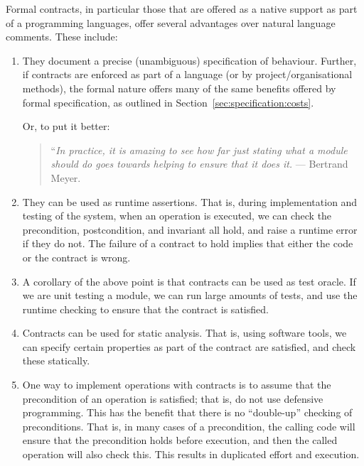 Formal contracts, in particular those that are offered as a native support as part of a programming languages, offer several advantages over natural language comments. These include:

\begin{enumerate}

 \item They document a precise (unambiguous) specification of behaviour. Further, if contracts are enforced as part of a language (or by project/organisational methods), the formal nature offers many of the same benefits offered by formal specification, as outlined in Section~\ref{sec:specification:costs}.

 Or, to put it better:

\begin{quote}
``\emph{In practice, it is amazing to see how far just stating what a module should do goes towards helping to ensure that it does it.} --- Bertrand Meyer.
\end{quote}

 \item They can be used as runtime assertions. That is, during implementation and testing of the system, when an operation is executed, we can check the precondition, postcondition, and invariant all hold, and raise a runtime error if they do not. The failure of a contract to hold implies that either the code or the contract is wrong.

 \item A corollary of the above point is that contracts can be used as test oracle. If we are unit testing a module, we can run large amounts of tests, and use the runtime checking to ensure that the contract is satisfied.

 \item Contracts can be used for static analysis. That is, using software tools, we can specify certain properties as part of the contract are satisfied, and check these statically.

 \item One way to implement operations with contracts is to assume that the precondition of an operation is satisfied; that is, do not use defensive programming. This has the benefit that there is no ``double-up'' checking of preconditions. That is, in many cases of a precondition, the calling code will ensure that the precondition holds before execution, and then the called operation will also check this. This results in duplicated effort and execution.

\end{enumerate}

